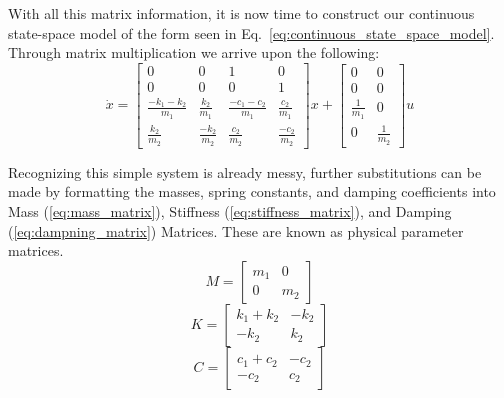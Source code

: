 With all this matrix information, it is now time to construct our continuous state-space model of the form seen in Eq.~\ref{eq:continuous_state_space_model}. Through matrix multiplication we arrive upon the following:
\begin{equation} 
    \dot x =
    \begin{bmatrix}
        0 & 0 & 1 & 0 \\
        0 & 0 & 0 & 1 \\
        \frac{-k_1-k_2}{m_1} & \frac{k_2}{m_1} & \frac{-c_1-c_2}{m_1} & \frac{c_2}{m_1} \\
        \frac{k_2}{m_2} & \frac{-k_2}{m_2} & \frac{c_2}{m_2} & \frac{-c_2}{m_2}
    \end{bmatrix}
    x +
    \begin{bmatrix}
        0 & 0 \\
        0 & 0 \\
        \frac{1}{m_1} & 0 \\
        0 & \frac{1}{m_2}
    \end{bmatrix}
    u
    \label{eq:spring_mass_state_space_continuous}
\end{equation}

Recognizing this simple system is already messy, further substitutions can be made by formatting the masses, spring constants, and damping coefficients into Mass (\ref{eq:mass_matrix}), Stiffness (\ref{eq:stiffness_matrix}), and Damping (\ref{eq:dampning_matrix}) Matrices. These are known as physical parameter matrices.
\begin{equation}
    M = 
    \begin{bmatrix}
        m_1 & 0 \\
        0 & m_2
    \end{bmatrix}
    \label{eq:mass_matrix}
\end{equation}
\begin{equation}
    K =
    \begin{bmatrix}
        k_1 + k_2 & -k_2 \\
        -k_2 & k_2
    \end{bmatrix}
    \label{eq:stiffness_matrix}
\end{equation}
\begin{equation}
    C = 
    \begin{bmatrix}
        c_1 + c_2 & -c_2 \\
        -c_2 & c_2
    \end{bmatrix}
    \label{eq:dampning_matrix}
\end{equation}

